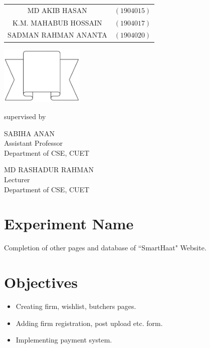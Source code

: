 \documentclass[a4paper,12pt]{report}
\begin{document}
\begin{titlepage}
{		\begin{tabular}{cl}
			MD AKIB HASAN        & $(1904015)$ \\
K.M. MAHABUB HOSSAIN & $(1904017)$ \\
			SADMAN RAHMAN ANANTA & $(1904020)$ \\
		\end{tabular}
	}
	\parbox[r]{6cm}{
		\vspace{1cm}
		\begin{center}
			\includegraphics[width=4cm, keepaspectratio]{remarks.png}
		\end{center}
	}

	\vspace{0.5cm}
	supervised by

	\parbox[l]{7.5cm}{\begin{center}

			SABIHA ANAN\\
\footnotesize{Assistant Professor\\
				Department of CSE, CUET}
		\end{center}
	}
	\parbox[r]{7.5cm}{\begin{center}

			MD RASHADUR RAHMAN\\
\footnotesize{Lecturer \\
				Department of CSE, CUET}
		\end{center}
	}

	\vfill
\end{titlepage}


\onehalfspacing

\section*{Experiment Name}
Completion of other pages and  database of ``SmartHaat" Website.
\section*{Objectives}
\begin{itemize}
\item Creating firm, wishlist, butchers pages.
\item Adding firm registration, post upload etc. form.
\item Implementing payment system.
\end{itemize}
\end{document}
